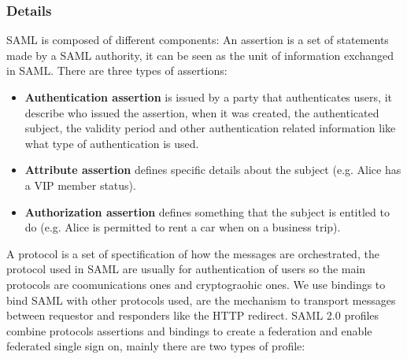 \subsubsection{Details}
SAML is composed of different components:
An assertion is a set of statements made by a SAML authority, it can be seen as the unit of information exchanged in SAML. There are three types of assertions:
\begin{itemize}
    \item \textbf{Authentication assertion} is issued by a party that authenticates users, it describe who issued the assertion, when it was created, the authenticated subject, the validity period and other authentication related information like what type of authentication is used. 
    \item \textbf{Attribute assertion} defines specific details about the subject (e.g. Alice has a VIP member status).
    \item \textbf{Authorization assertion} defines something that the subject is entitled to do (e.g. Alice is permitted to rent a car when on a business trip).
\end{itemize}
A protocol is a set of spectification of how the messages are orchestrated, the protocol used in SAML are usually for authentication of users so the main protocols are coomunications ones and cryptograohic ones.
We use bindings to bind SAML with other protocols used, are the mechanism to transport messages between requestor and responders like the HTTP redirect.
SAML 2.0 profiles combine protocols assertions and bindings to create a federation and enable federated single sign on, mainly there are two types of profile:
